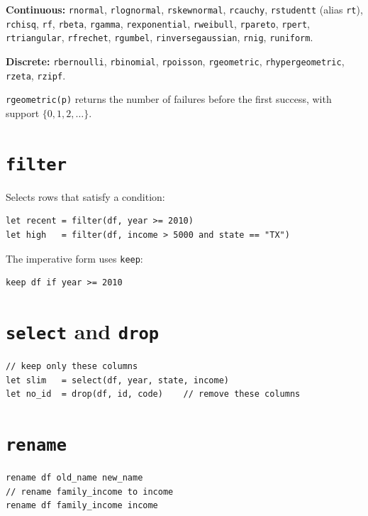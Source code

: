 \textbf{Continuous:} \lstinline{rnormal}, \lstinline{rlognormal}, \lstinline{rskewnormal}, \lstinline{rcauchy}, \lstinline{rstudentt} (alias \lstinline{rt}), \lstinline{rchisq}, \lstinline{rf}, \lstinline{rbeta}, \lstinline{rgamma}, \lstinline{rexponential}, \lstinline{rweibull}, \lstinline{rpareto}, \lstinline{rpert}, \lstinline{rtriangular}, \lstinline{rfrechet}, \lstinline{rgumbel}, \lstinline{rinversegaussian}, \lstinline{rnig}, \lstinline{runiform}.

\textbf{Discrete:} \lstinline{rbernoulli}, \lstinline{rbinomial}, \lstinline{rpoisson}, \lstinline{rgeometric}, \lstinline{rhypergeometric}, \lstinline{rzeta}, \lstinline{rzipf}.

\begin{nota}
  \lstinline{rgeometric(p)} returns the number of failures before the first
  success, with support $\{0, 1, 2, \ldots\}$.
\end{nota}

\section{\texttt{filter}}

Selects rows that satisfy a condition:

\begin{lstlisting}
let recent = filter(df, year >= 2010)
let high   = filter(df, income > 5000 and state == "TX")
\end{lstlisting}

The imperative form uses \lstinline{keep}:

\begin{lstlisting}
keep df if year >= 2010
\end{lstlisting}

\section{\texttt{select} and \texttt{drop}}

\begin{lstlisting}
// keep only these columns
let slim   = select(df, year, state, income)
let no_id  = drop(df, id, code)    // remove these columns
\end{lstlisting}

\section{\texttt{rename}}

\begin{lstlisting}
rename df old_name new_name
// rename family_income to income
rename df family_income income
\end{lstlisting}

